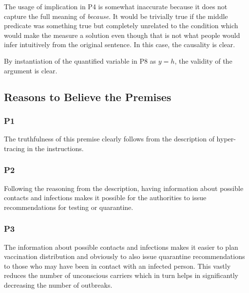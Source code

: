 \begin{argument}
\end{argument}

The usage of implication in P4 is somewhat inaccurate because it does not capture the full meaning of \emph{because}. It would be trivially true if the middle predicate was something true but completely unrelated to the condition which would make the measure a solution even though that is not what people would infer intuitively from the original sentence. In this case, the causality is clear.

By instantiation of the quantified variable in P8 as $y=h$, the validity of the argument is clear.

\subsection{Reasons to Believe the Premises} \label{subsec:premises}

\subsubsection*{P1}

The truthfulness of this premise clearly follows from the description of hyper-tracing in the instructions.

\subsubsection*{P2}

Following the reasoning from the description, having information about possible contacts and infections makes it possible for the authorities to issue recommendations for testing or quarantine.

\subsubsection*{P3}

The information about possible contacts and infections makes it easier to plan vaccination distribution and obviously to also issue quarantine recommendations to those who may have been in contact with an infected person. 
This vastly reduces the number of unconscious carriers which in turn helps in significantly decreasing the number of outbreaks.

